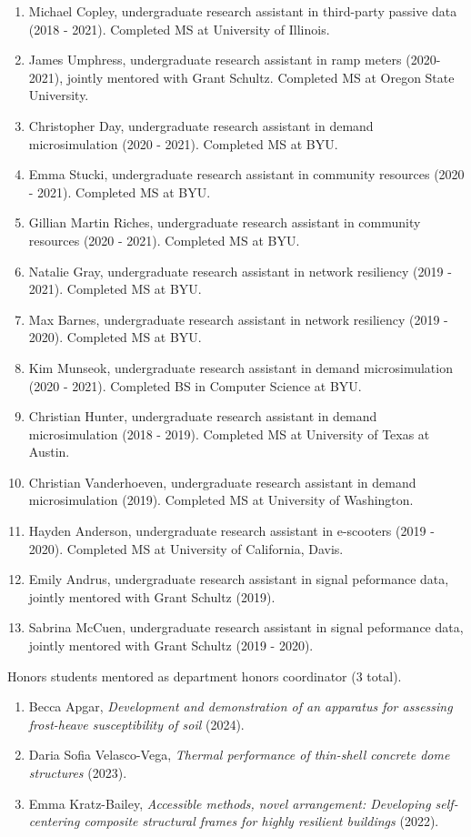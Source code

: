 \documentclass[margin,line]{res}
\newif\ifdetail
\newcounter{enuminitialize}
\newenvironment{myenum}[1][]
{%
 \setcounter{enuminitialize}{#1}
 \addtocounter{enuminitialize}{2}
 \begin{enumerate}[left= 4pt, itemsep=8pt, start=\value{enuminitialize}, label=\arabic*\addtocounter{enumi}{-2}]
}
{%
 \end{enumerate}
}
\begin{document}
\begin{resume}
\begin{myenum}[28]
  \item Michael Copley, undergraduate research assistant in third-party passive data (2018 - 2021). Completed MS at University of Illinois.
  \item James Umphress, undergraduate research assistant in ramp meters (2020-2021), jointly mentored with Grant Schultz. Completed MS at Oregon State University.
  \item Christopher Day, undergraduate research assistant in demand microsimulation (2020 - 2021). Completed MS at BYU.
  \item Emma Stucki, undergraduate research assistant in community resources (2020 - 2021). Completed MS at BYU.
  \item Gillian Martin Riches, undergraduate research assistant in community resources (2020 - 2021). Completed MS at BYU.
  \item Natalie Gray, undergraduate research assistant in network resiliency (2019 - 2021). Completed MS at BYU.
  \item Max Barnes, undergraduate research assistant in network resiliency (2019 - 2020). Completed MS at BYU.
  \item Kim Munseok, undergraduate research assistant in demand microsimulation (2020 - 2021). Completed BS in Computer Science at BYU.
  \item Christian Hunter, undergraduate research assistant in demand microsimulation (2018 - 2019). Completed MS at University of Texas at Austin.
  \item Christian Vanderhoeven, undergraduate research assistant in demand microsimulation (2019). Completed MS at University of Washington.
  \item Hayden Anderson, undergraduate research assistant in e-scooters (2019 - 2020). Completed MS at University of California, Davis.
  \item Emily Andrus, undergraduate research assistant in signal peformance data, jointly mentored with Grant Schultz (2019).
  \item Sabrina McCuen, undergraduate research assistant in signal peformance data, jointly mentored with Grant Schultz (2019 - 2020).
\end{myenum}

Honors students mentored as department honors coordinator (3 total).
\vspace{0.2cm}
\begin{myenum}[3]
  \ifdetail {\color{NavyBlue} \fi
  \item Becca Apgar, \textit{Development and demonstration of an apparatus for assessing frost-heave susceptibility of soil} (2024).
  \item Daria Sofia Velasco-Vega, \textit{Thermal performance of thin-shell concrete dome structures} (2023).
  \item Emma Kratz-Bailey, \textit{Accessible methods, novel arrangement: Developing self-centering composite structural frames for highly resilient buildings} (2022).
  \ifdetail } \fi
\end{myenum}




\end{resume}
\end{document}
